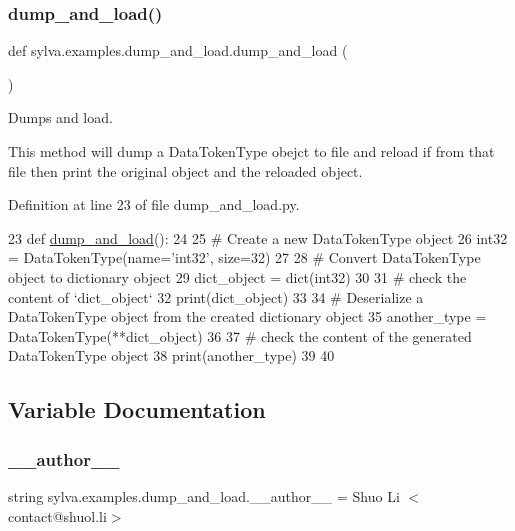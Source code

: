 \subsubsection{\texorpdfstring{dump\+\_\+and\+\_\+load()}{dump\_and\_load()}}
{\footnotesize\ttfamily def sylva.\+examples.\+dump\+\_\+and\+\_\+load.\+dump\+\_\+and\+\_\+load (\begin{DoxyParamCaption}{ }\end{DoxyParamCaption})}



Dumps and load. 

This method will dump a Data\+Token\+Type obejct to file and reload if from that file then print the original object and the reloaded object. 

Definition at line 23 of file dump\+\_\+and\+\_\+load.\+py.


\begin{DoxyCode}
23 \textcolor{keyword}{def }\hyperlink{namespacesylva_1_1examples_1_1dump__and__load_afb1e7b81c3c5d6dcb649ce2c3e32bdf7}{dump\_and\_load}():
24 
25     \textcolor{comment}{# Create a new DataTokenType object}
26     int32 = DataTokenType(name=\textcolor{stringliteral}{'int32'}, size=32)
27 
28     \textcolor{comment}{# Convert DataTokenType object to dictionary object}
29     dict\_object = dict(int32)
30 
31     \textcolor{comment}{# check the content of `dict\_object`}
32     print(dict\_object)
33 
34     \textcolor{comment}{# Deserialize a DataTokenType object from the created dictionary object}
35     another\_type = DataTokenType(**dict\_object)
36 
37     \textcolor{comment}{# check the content of the generated DataTokenType object}
38     print(another\_type)
39 
40 
\end{DoxyCode}


\subsection{Variable Documentation}
\mbox{\label{namespacesylva_1_1examples_1_1dump__and__load_adcbf27850becc572711605ccd2a292cb}} 
\subsubsection{\texorpdfstring{\+\_\+\+\_\+author\+\_\+\+\_\+}{\_\_author\_\_}}
{\footnotesize\ttfamily string sylva.\+examples.\+dump\+\_\+and\+\_\+load.\+\_\+\+\_\+author\+\_\+\+\_\+ = \textquotesingle{}Shuo Li $<$contact@shuol.\+li$>$\textquotesingle{}\hspace{0.3cm}{\ttfamily [private]}}



